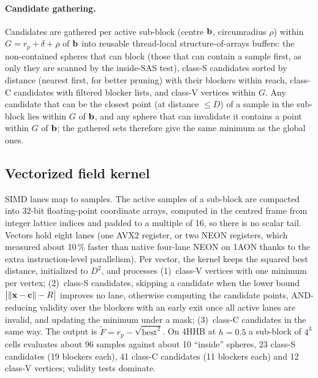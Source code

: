 \paragraph{Candidate gathering.}
Candidates are gathered per active sub-block (centre $\mathbf{b}$,
circumradius $\rho$) within $G = r_p + \delta + \rho$ of $\mathbf{b}$ into
reusable thread-local structure-of-arrays buffers: the non-contained
spheres that can block (those that can contain a sample first, as only
they are scanned by the inside-SAS test), class-S candidates sorted by
distance (nearest first, for better pruning) with their blockers within
reach, class-C candidates with filtered blocker lists, and class-V
vertices within $G$. Any candidate that can be the closest point (at
distance $\le D$) of a sample in the sub-block lies within $G$ of
$\mathbf{b}$, and any sphere that can invalidate it contains a point within
$G$ of $\mathbf{b}$; the gathered sets therefore give the same minimum as the
global ones.

\subsection{Vectorized field kernel}
\label{sec:kernel}

SIMD lanes map to samples. The active samples of a sub-block are compacted
into 32-bit floating-point coordinate arrays, computed in the centred frame
from integer lattice indices and padded to a multiple of 16, so there is no
scalar tail. Vectors hold eight lanes (one AVX2 register, or two NEON
registers, which measured about 10\,\% faster than native four-lane NEON on
1AON thanks to the extra instruction-level parallelism). Per vector, the
kernel keeps the squared best distance, initialized to $D^2$, and processes
(1)~class-V vertices with one minimum per vertex; (2)~class-S candidates,
skipping a candidate when the lower bound
$\bigl|\lVert\mathbf{x} - \mathbf{c}\rVert - R\bigr|$ improves no lane, otherwise
computing the candidate points, AND-reducing validity over the blockers
with an early exit once all active lanes are invalid, and updating the
minimum under a mask; (3)~class-C candidates in the same way. The output is
$\tilde F = r_p - \sqrt{\text{best}^2}$. On 4HHB at $h = 0.5$\Ang{} a
sub-block of $4^3$ cells evaluates about 96 samples against about 10
``inside'' spheres, 23 class-S candidates (19 blockers each), 41 class-C
candidates (11 blockers each) and 12 class-V vertices; validity tests
dominate.

